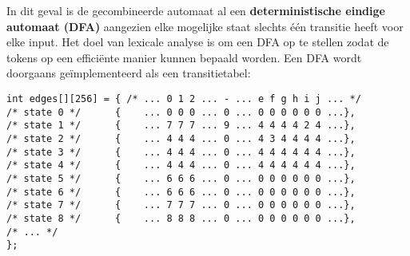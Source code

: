\begin{itemize}
	In dit geval is de gecombineerde automaat al een \textbf{deterministische eindige automaat (DFA)} aangezien elke mogelijke staat slechts één transitie heeft voor elke input. Het doel van lexicale analyse is om een DFA op te stellen zodat de tokens op een efficiënte manier kunnen bepaald worden. Een DFA wordt doorgaans geïmplementeerd als een transitietabel:
	\begin{lstlisting}
int edges[][256] = { /* ... 0 1 2 ... - ... e f g h i j ... */ 
/* state 0 */      {    ... 0 0 0 ... 0 ... 0 0 0 0 0 0 ...},
/* state 1 */      {    ... 7 7 7 ... 9 ... 4 4 4 4 2 4 ...},
/* state 2 */      {    ... 4 4 4 ... 0 ... 4 3 4 4 4 4 ...},
/* state 3 */      {    ... 4 4 4 ... 0 ... 4 4 4 4 4 4 ...},
/* state 4 */      {    ... 4 4 4 ... 0 ... 4 4 4 4 4 4 ...},
/* state 5 */      {    ... 6 6 6 ... 0 ... 0 0 0 0 0 0 ...},
/* state 6 */      {    ... 6 6 6 ... 0 ... 0 0 0 0 0 0 ...},
/* state 7 */      {    ... 7 7 7 ... 0 ... 0 0 0 0 0 0 ...},
/* state 8 */      {    ... 8 8 8 ... 0 ... 0 0 0 0 0 0 ...},
/* ... */
};
	\end{lstlisting}
\end{itemize}

